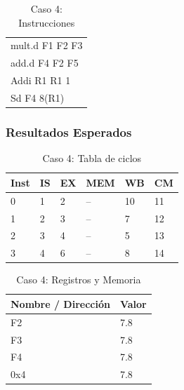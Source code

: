 \documentclass[a4paper]{article}
\begin{document}
	\begin{table}[H]
		\centering
		\caption*{Caso 4: Instrucciones}
		\begin{tabular}{l}
			mult.d F1 F2 F3 \\
			add.d F4 F2 F5 \\
			Addi R1 R1 1 \\
			Sd F4 8(R1)
		\end{tabular}
	\end{table}

	\subsubsection*{Resultados Esperados}

	\begin{table}[H]
		\centering
		\caption*{Caso 4: Tabla de ciclos}
		\begin{tabular}{|l|l|l|l|l|l|}
			\hline
			\textbf{Inst} & \textbf{IS} & \textbf{EX} & \textbf{MEM} & \textbf{WB} & \textbf{CM} \\ \hline
			0             & 1           & 2           & --           & 10          & 11          \\ \hline
			1             & 2           & 3           & --           & 7           & 12          \\ \hline
			2             & 3           & 4           & --           & 5           & 13          \\ \hline
			3             & 4           & 6           & --           & 8           & 14          \\ \hline
			\end{tabular}
	\end{table}

	\begin{table}[H]
		\centering
		\caption*{Caso 4: Registros y Memoria}
		\begin{tabular}{|l|l|}
			\hline
			\textbf{Nombre / Dirección} & \textbf{Valor} \\ \hline
			F2                          & 7.8            \\ \hline
			F3                          & 7.8            \\ \hline
			F4                          & 7.8            \\ \hline
			0x4                         & 7.8            \\ \hline
		\end{tabular}
	\end{table}
\end{document}
